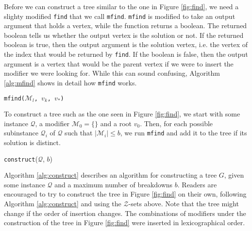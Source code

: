 Before we can construct a tree similar to the one in Figure \ref{fig:find},
we need a slighty modified \texttt{find} that we call \texttt{mfind}.
\texttt{mfind} is modified to take an output argument that holds a vertex,
while the function returns a boolean.
The returned boolean tells us whether the output vertex is the solution or not.
If the returned boolean is true, then the output argument is the solution
vertex, i.e. the vertex of the index that would be returned by \texttt{find}.
If the boolean is false, then the output argument is a vertex that would be the
parent vertex if we were to insert the modifier we were looking for.
While this can sound confusing, Algorithm \ref{alg:mfind} shows in detail how
\texttt{mfind} works.

\begin{algorithm}[ht!]
\caption{\texttt{mfind($\mathcal{M}_l$, $v_k$, $v_*$)}}
\label{alg:mfind}

\end{algorithm}
To construct a tree such as the one seen in Figure \ref{fig:find}, we start
with some instance $\mathcal{Q}$, a modifier $\mathcal{M}_0 = \{ {} \}$ and
a root $v_0$.
Then, for each possible subinstance $\mathcal{Q}_i$ of $\mathcal{Q}$ such that
$|\mathcal{M}_i| \leq b$, we run \texttt{mfind} and add it to the tree if its
solution is distinct.

\begin{algorithm}[ht!]
\caption{\texttt{construct}($\mathcal{Q}$, $b$)}
\label{alg:construct}

\end{algorithm}
Algorithm \ref{alg:construct} describes an algorithm for constructing a tree
$G$, given some instance $\mathcal{Q}$ and a maximum number of breakdowns $b$.
Readers are encouraged to try to construct the tree in Figure \ref{fig:find} on
their own, following Algorithm \ref{alg:construct} and using the
$\mathcal{Z}$-sets above. Note that the tree might change if the order of
insertion changes. The combinations of modifiers under the construction of the
tree in Figure \ref{fig:find} were inserted in lexicographical order.
